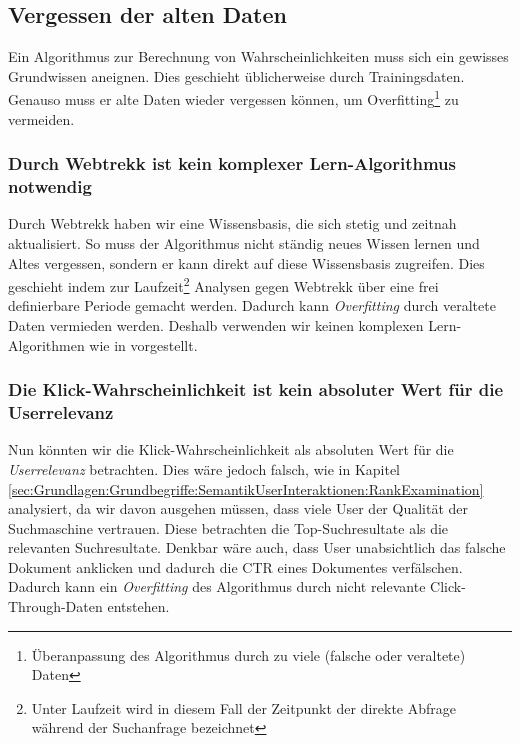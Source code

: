 \subsection{Vergessen der alten Daten}
\label{sec:Reranking:Methodik:Vergessen}

Ein Algorithmus zur Berechnung von Wahrscheinlichkeiten muss sich ein gewisses Grundwissen aneignen. Dies geschieht üblicherweise durch Trainingsdaten. Genauso muss er alte Daten wieder vergessen können, um Overfitting\footnote{Überanpassung des Algorithmus durch zu viele (falsche oder veraltete) Daten} zu vermeiden. 

\subsubsection{Durch Webtrekk ist kein komplexer Lern-Algorithmus notwendig}
\label{sec:Reranking:Methodik:Vergessen:Lern-Algorithmus}

Durch Webtrekk haben wir eine Wissensbasis, die sich stetig und zeitnah aktualisiert. So muss der Algorithmus nicht ständig neues Wissen lernen und Altes vergessen, sondern er kann direkt auf diese Wissensbasis zugreifen. Dies geschieht indem zur Laufzeit\footnote{Unter Laufzeit wird in diesem Fall der Zeitpunkt der direkte Abfrage während der Suchanfrage bezeichnet} Analysen gegen Webtrekk über eine frei definierbare Periode gemacht werden. Dadurch kann \textit{Overfitting} durch veraltete Daten vermieden werden. Deshalb verwenden wir keinen komplexen Lern-Algorithmen wie in \cite{IWUSBI} vorgestellt.

\subsubsection{Die Klick-Wahrscheinlichkeit ist kein absoluter Wert für die Userrelevanz}
\label{sec:Reranking:Methodik:Vergessen:Relevanzfeedback}

Nun könnten wir die Klick-Wahrscheinlichkeit als absoluten Wert für die \textit{Userrelevanz} betrachten. Dies wäre jedoch falsch, wie in Kapitel \ref{sec:Grundlagen:Grundbegriffe:SemantikUserInteraktionen:RankExamination} analysiert, da wir davon ausgehen müssen, dass viele User der Qualität der Suchmaschine vertrauen. Diese betrachten die \glqq Top-Suchresultate\grqq{} als die relevanten Suchresultate. Denkbar wäre auch, dass User unabsichtlich das falsche Dokument anklicken und dadurch die CTR eines Dokumentes verfälschen. Dadurch kann ein \textit{Overfitting} des Algorithmus durch nicht relevante Click-Through-Daten entstehen.


